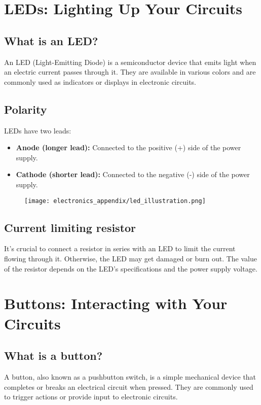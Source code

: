 \section{LEDs: Lighting Up Your Circuits}
\subsection{What is an LED?}
An LED (Light-Emitting Diode) is a semiconductor device that emits light when an electric current
passes through it. They are available in various colors and are commonly used as indicators or
displays in electronic circuits.

\subsection{Polarity}
LEDs have two leads:
\begin{itemize}
\item \textbf{Anode (longer lead):} Connected to the positive (+) side of the power supply.
\item \textbf{Cathode (shorter lead):} Connected to the negative (-) side of the power supply.
\end{itemize}

\begin{figure}[H]
\centering
    \texttt{[image: electronics\_appendix/led\_illustration.png]}
\end{figure}

\subsection{Current limiting resistor}
It's crucial to connect a resistor in series with an LED to limit the current flowing through it.
Otherwise, the LED may get damaged or burn out. The value of the resistor depends on the LED's
specifications and the power supply voltage.

\section{Buttons: Interacting with Your Circuits}
\subsection{What is a button?}
A button, also known as a pushbutton switch, is a simple mechanical device that completes or breaks
an electrical circuit when pressed. They are commonly used to trigger actions or provide input to
electronic circuits.

